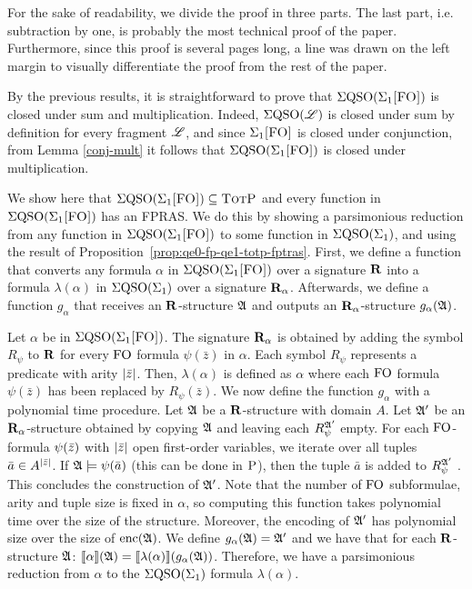 
For the sake of readability, we divide the proof in three parts. The last part, i.e. subtraction by one, is probably the most technical proof of the paper. Furthermore, since this proof is several pages long, a line was drawn on the left margin to visually differentiate the proof from the rest of the paper.

\medskip

 By the previous results, it is straightforward to prove that $\Sigma{\rm QSO}(\Sigma_{1}\textsc{[FO]})$ is closed under sum and multiplication. Indeed, $\Sigma{\rm QSO}(\mathscr{L})$ is closed under sum by definition for every fragment $\mathscr{L}$, and since $\Sigma_{1}\textsc{[FO]}$ is closed under conjunction, from Lemma \ref{conj-mult} it follows that $\Sigma{\rm QSO}(\Sigma_{1}\textsc{[FO]})$ is closed under multiplication.
\medskip

  We show here that $\Sigma{\rm QSO}(\Sigma_{1}\textsc{[FO]}) \subseteq \text{\sc TotP}$ and every function in $\Sigma{\rm QSO}(\Sigma_{1}\textsc{[FO]})$ has an FPRAS. We do this by showing a parsimonious reduction from any function in $\Sigma{\rm QSO}(\Sigma_{1}\textsc{[FO]})$ to some function in $\Sigma{\rm QSO}(\Sigma_{1})$, and using the result of Proposition~\ref{prop:qe0-fp-qe1-totp-fptras}. First, we define a function that converts any formula $\alpha$ in $\Sigma{\rm QSO}(\Sigma_{1}\textsc{[FO]})$ over a signature $\mathbf{R}$ into a formula $\lambda(\alpha)$ in $\Sigma{\rm QSO}(\Sigma_{1})$ over a signature $\mathbf{R}_{\alpha}$. Afterwards, we define a function $g_{\alpha}$ that receives an $\mathbf{R}$-structure $\mathfrak{A}$ and outputs an $\mathbf{R}_{\alpha}$-structure $g_{\alpha}(\mathfrak{A})$.

Let $\alpha$ be in $\Sigma{\rm QSO}(\Sigma_{1}\textsc{[FO]})$. The signature $\mathbf{R}_{\alpha}$ is obtained by adding the symbol $R_{\psi}$ to $\mathbf{R}$ for every ${\rm FO}$ formula $\psi(\bar{z})$ in $\alpha$. Each symbol $R_{\psi}$ represents a predicate with arity $\vert \bar{z} \vert$. Then, $\lambda(\alpha)$ is defined as $\alpha$ where each ${\rm FO}$ formula $\psi(\bar{z})$ has been replaced by $R_{\psi}(\bar{z})$. We now define the function $g_{\alpha}$ with a polynomial time procedure. Let $\mathfrak{A}$ be a $\mathbf{R}$-structure with domain $A$. Let $\mathfrak{A}'$ be an $\mathbf{R}_{\alpha}$-structure obtained by copying $\mathfrak{A}$ and leaving each $R_{\psi}^{\mathfrak{A}'}$ empty. For each ${\rm FO}$-formula $\psi(\bar{z})$ with $\vert \bar{z} \vert$ open first-order variables, we iterate over all tuples $\bar{a} \in A^{\vert \bar{z} \vert}$. If $\mathfrak{A}\models\psi(\bar{a})$ (this can be done in $\text{\sc P}$), then the tuple $\bar{a}$ is added to $R_{\psi}^{\mathfrak{A}'}$ . This concludes the construction of $\mathfrak{A}'$. Note that the number of ${\rm FO}$ subformulae, arity and tuple size is fixed in $\alpha$, so computing this function takes polynomial time over the size of the structure. Moreover, the encoding of $\mathfrak{A}'$ has polynomial size over the size of ${\rm enc}(\mathfrak{A})$. We define $g_{\alpha}(\mathfrak{A}) = \mathfrak{A}'$ and we have that for each $\mathbf{R}$-structure $\mathfrak{A}$: ${\llbracket{}{\alpha}\rrbracket}(\mathfrak{A}) = {\llbracket{}{\lambda(\alpha)}\rrbracket}(g_{\alpha}(\mathfrak{A}))$. Therefore, we have a parsimonious reduction from $\alpha$ to the $\Sigma{\rm QSO}(\Sigma_{1})$ formula $\lambda(\alpha)$.


